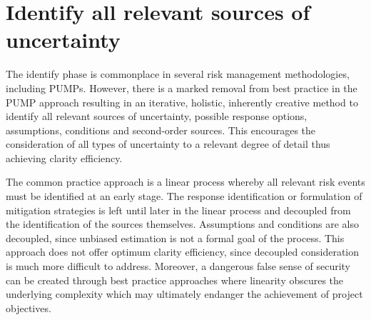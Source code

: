 
\section{Identify all relevant sources of uncertainty} \label{s:Identify}





The identify phase is commonplace in several risk management methodologies, including PUMPs. 
However, there is a marked removal from best practice in the PUMP approach resulting in an iterative, holistic, inherently creative method to identify all relevant sources of uncertainty, possible response options, assumptions, conditions and second-order sources.
This encourages the consideration of all types of uncertainty to a relevant degree of detail thus achieving clarity efficiency.

The common practice approach is a linear process whereby all relevant risk events must be identified at an early stage. 
The response identification or formulation of mitigation strategies is left until later in the linear process and decoupled from the identification of the sources themselves.
Assumptions and conditions are also decoupled, since unbiased estimation is not a formal goal of the process. 
This approach does not offer optimum clarity efficiency, since decoupled consideration is much more difficult to address.
Moreover, a dangerous false sense of security can be created through best practice approaches where linearity obscures the underlying complexity which may ultimately endanger the achievement of project objectives.
                         
